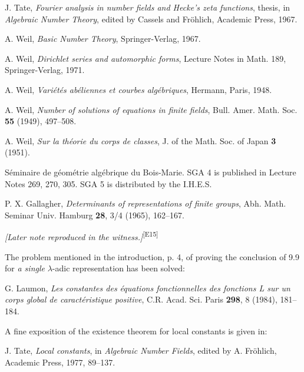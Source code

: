 \documentclass[10pt,letterpaper]{article}
\newcommand{\auditmark}[1]{\textsuperscript{\normalfont\scriptsize[E#1]}}
\begin{document}
\begin{enumerate}[label={[\arabic*]},leftmargin=2.8em]
\item J. Tate, \emph{Fourier analysis in number fields and Hecke's zeta functions}, thesis, in \emph{Algebraic Number Theory}, edited by Cassels and Fröhlich, Academic Press, 1967.
\item A. Weil, \emph{Basic Number Theory}, Springer-Verlag, 1967.
\item A. Weil, \emph{Dirichlet series and automorphic forms}, Lecture Notes in Math. 189, Springer-Verlag, 1971.
\item A. Weil, \emph{Variétés abéliennes et courbes algébriques}, Hermann, Paris, 1948.
\item A. Weil, \emph{Number of solutions of equations in finite fields}, Bull. Amer. Math. Soc. \textbf{55} (1949), 497--508.
\item A. Weil, \emph{Sur la théorie du corps de classes}, J. of the Math. Soc. of Japan \textbf{3} (1951).
\item[SGA] Séminaire de géométrie algébrique du Bois-Marie. SGA 4 is published in Lecture Notes 269, 270, 305. SGA 5 is distributed by the I.H.E.S.
\item P. X. Gallagher, \emph{Determinants of representations of finite groups}, Abh. Math. Seminar Univ. Hamburg \textbf{28}, 3/4 (1965), 162--167.
\end{enumerate}

\medskip
\noindent\textit{[Later note reproduced in the witness.]}\auditmark{15}

\noindent The problem mentioned in the introduction, p. 4, of proving the conclusion of 9.9 for \emph{a single} \(\lambda\)-adic representation has been solved:

\noindent G. Laumon, \emph{Les constantes des équations fonctionnelles des fonctions L sur un corps global de caractéristique positive}, C.R. Acad. Sci. Paris \textbf{298}, 8 (1984), 181--184.

\medskip
\noindent A fine exposition of the existence theorem for local constants is given in:

\noindent J. Tate, \emph{Local constants}, in \emph{Algebraic Number Fields}, edited by A. Fröhlich, Academic Press, 1977, 89--137.




\begingroup
\fontsize{10pt}{11pt}\selectfont
\setlength{\parskip}{0pt}
\setlength{\abovedisplayskip}{6pt plus 2pt minus 2pt}
\setlength{\belowdisplayskip}{6pt plus 2pt minus 2pt}
\clearpage
\end{document}
